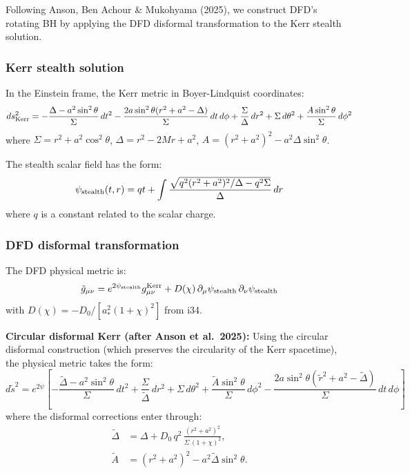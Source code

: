 \documentclass[11pt,a4paper]{article}
\begin{document}
Following Anson, Ben Achour \& Mukohyama (2025), we construct DFD's rotating BH by applying the DFD disformal transformation to the Kerr stealth solution.

\subsubsection{Kerr stealth solution}

In the Einstein frame, the Kerr metric in Boyer-Lindquist coordinates:
\begin{equation}
ds^2_{\rm Kerr} = -\frac{\Delta - a^2\sin^2\theta}{\Sigma}\,dt^2 - \frac{2a\sin^2\theta(r^2+a^2-\Delta)}{\Sigma}\,dt\,d\phi + \frac{\Sigma}{\Delta}\,dr^2 + \Sigma\,d\theta^2 + \frac{A\sin^2\theta}{\Sigma}\,d\phi^2
\end{equation}
where $\Sigma = r^2 + a^2\cos^2\theta$, $\Delta = r^2 - 2Mr + a^2$, $A = (r^2+a^2)^2 - a^2\Delta\sin^2\theta$.

The stealth scalar field has the form:
\begin{equation}
\psi_{\rm stealth}(t,r) = qt + \int\frac{\sqrt{q^2(r^2+a^2)^2/\Delta - q^2\Sigma}}{\Delta}\,dr
\end{equation}
where $q$ is a constant related to the scalar charge.

\subsubsection{DFD disformal transformation}

The DFD physical metric is:
\begin{equation}
\tilde{g}_{\mu\nu} = e^{2\psi_{\rm stealth}}g_{\mu\nu}^{\rm Kerr} + D(\chi)\,\partial_\mu\psi_{\rm stealth}\,\partial_\nu\psi_{\rm stealth}
\end{equation}
with $D(\chi) = -D_0/[a_*^2(1+\chi)^2]$ from i34.

\textbf{Circular disformal Kerr (after Anson et al.\ 2025):} Using the circular disformal construction (which preserves the circularity of the Kerr spacetime), the physical metric takes the form:
\begin{equation}
d\tilde{s}^2 = e^{2\psi}\left[-\frac{\tilde\Delta - a^2\sin^2\theta}{\Sigma}\,dt^2 + \frac{\Sigma}{\tilde\Delta}\,dr^2 + \Sigma\,d\theta^2 + \frac{\tilde A\sin^2\theta}{\Sigma}\,d\phi^2 - \frac{2a\sin^2\theta(\tilde r^2 + a^2 - \tilde\Delta)}{\Sigma}\,dt\,d\phi\right]
\end{equation}
where the disformal corrections enter through:
\begin{align}
\tilde\Delta &= \Delta + D_0\,q^2\,\frac{(r^2+a^2)^2}{\Sigma\,(1+\chi)^2}, \\
\tilde A &= (r^2+a^2)^2 - a^2\tilde\Delta\sin^2\theta.
\end{align}
\end{document}
